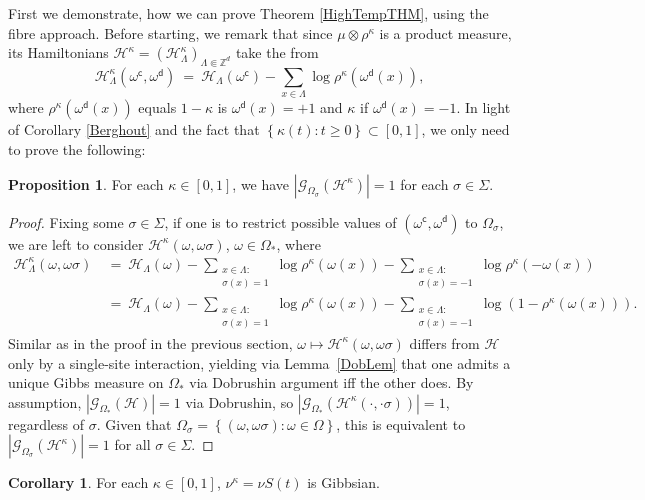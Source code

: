 \documentclass[12pt]{article}
\newcommand{\G}{\mathcal{G}}
\renewcommand{\H}{\mathcal{H}}
\newcommand{\Z}{\mathbb{Z}}
\newcommand{\set}[1]{\left\{#1\right\}}
\newcommand{\oklepaj}[1]{\left(#1\right)}
\newcommand{\pika}{\boldsymbol{\cdot}}
\newcommand{\1}{\mathbbm{1}}
\renewcommand{\c}{\mathsf{c}}
\newcommand{\5}{\vspace{0.5cm}}
\theoremstyle{definition}
\newtheorem{prop}[thm]{Proposition}
\newtheorem{cor}[thm]{Corollary}
\begin{document}
First we demonstrate, how we can prove Theorem \ref{HighTempTHM}, using the fibre approach.  Before starting, we remark that since $\mu\otimes\rho^\kappa$ is a product measure, its Hamiltonians $\H^\kappa=(\H_\Lambda^\kappa)_{\Lambda\Subset\Z^d}$ take the from
$$\H_\Lambda^\kappa(\omega^\c,\omega^\mathsf{d}) ~=~ \H_\Lambda(\omega^\c)-\sum_{x\in\Lambda}\log\rho^\kappa(\omega^\mathsf{d}(x)),$$
where $\rho^\kappa(\omega^\mathsf{d}(x))$ equals $1-\kappa$ is $\omega^\mathsf{d}(x)=+1$ and $\kappa$ if $\omega^\mathsf{d}(x)=-1$.
In light of Corollary \ref{Berghout} and the fact that $\set{\kappa(t):t\geq 0}\subset[0,1]$, we only need to prove the following:

\begin{prop}\label{HighTempAlt}
For each $\kappa\in[0,1]$, we have $|\G_{\Omega_\sigma}(\H^\kappa)|=1$ for each $\sigma\in\Sigma$.
\end{prop}

\begin{proof}
Fixing some $\sigma\in\Sigma$, if one is to restrict possible values of $(\omega^\c,\omega^\mathsf{d})$ to $\Omega_\sigma$, we are left to consider $\H^\kappa(\omega,\omega\sigma)$, $\omega\in\Omega_*$, where
\begin{align*}
\H_\Lambda^\kappa(\omega,\omega\sigma) ~&=~ \H_\Lambda(\omega) - \sum_{\substack{x\in\Lambda:\\\sigma(x)=1}}\log\rho^\kappa(\omega(x)) - \sum_{\substack{x\in\Lambda:\\\sigma(x)=-1}}\log\rho^\kappa(-\omega(x)) \\
&=~ \H_\Lambda(\omega) - \sum_{\substack{x\in\Lambda:\\\sigma(x)=1}}\log\rho^\kappa(\omega(x)) - \sum_{\substack{x\in\Lambda:\\\sigma(x)=-1}}\log\!\oklepaj{1-\rho^\kappa(\omega(x))}.
\end{align*}
Similar as in the proof in the previous section, $\omega\mapsto\H^\kappa(\omega,\omega\sigma)$ differs from $\H$ only by a single-site interaction, yielding via Lemma~\ref{DobLem} that one admits a unique Gibbs measure on $\Omega_*$ via Dobrushin argument iff the other does. By assumption, $|\G_{\Omega_*}(\H)|=1$ via Dobrushin, so $|\G_{\Omega_*}(\H^\kappa(\pika,\pika\sigma))|=1$, regardless of $\sigma$. Given that $\Omega_\sigma=\set{(\omega,\omega\sigma):\omega\in\Omega}$, this is equivalent to $|\G_{\Omega_\sigma}(\H^\kappa)|=1$ for all $\sigma\in\Sigma$.
\end{proof}

\begin{cor}
For each $\kappa\in[0,1]$, $\nu^\kappa=\nu S(t)$ is Gibbsian.
\end{cor}
\end{document}
